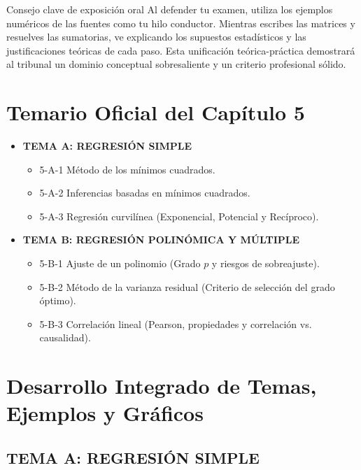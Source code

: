 \documentclass[11pt,letterpaper]{article}
\begin{document}
\begin{importanteBox}{Consejo clave de exposición oral}
Al defender tu examen, utiliza los ejemplos numéricos de las fuentes como tu hilo conductor. Mientras escribes las matrices y resuelves las sumatorias, ve explicando los supuestos estadísticos y las justificaciones teóricas de cada paso. Esta unificación teórica-práctica demostrará al tribunal un dominio conceptual sobresaliente y un criterio profesional sólido.
\end{importanteBox}

\section{Temario Oficial del Capítulo 5}
\begin{itemize}
    \item \textbf{TEMA A: REGRESIÓN SIMPLE}
    \begin{itemize}
        \item 5-A-1 Método de los mínimos cuadrados.
        \item 5-A-2 Inferencias basadas en mínimos cuadrados.
        \item 5-A-3 Regresión curvilínea (Exponencial, Potencial y Recíproco).
    \end{itemize}
    \item \textbf{TEMA B: REGRESIÓN POLINÓMICA Y MÚLTIPLE}
    \begin{itemize}
        \item 5-B-1 Ajuste de un polinomio (Grado $p$ y riesgos de sobreajuste).
        \item 5-B-2 Método de la varianza residual (Criterio de selección del grado óptimo).
        \item 5-B-3 Correlación lineal (Pearson, propiedades y correlación vs. causalidad).
    \end{itemize}
\end{itemize}

\newpage

\section{Desarrollo Integrado de Temas, Ejemplos y Gráficos}

\subsection{TEMA A: REGRESIÓN SIMPLE}
\end{document}
